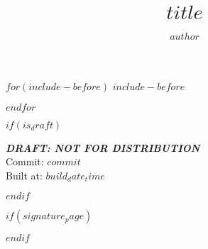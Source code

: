 \documentclass[11 pt]{report}
\begin{document}
$for(include-before)$
$include-before$

$endfor$

%

$if(is_draft)$
\thispagestyle{empty}%
    \null
    \vfill
    \begin{center}
        \rm\expandafter{\LARGE{\textbf{\emph{DRAFT: NOT FOR DISTRIBUTION}}}}\\
        [16 pt] 
        Commit: $commit$ \\
        \vspace{1em}
        Built at: $build_date_time$
    \end{center}
    \vfill
\newpage
$endif$


%


$if(signature_page)$
    
$endif$

\title{$title$}

\author{$author$}


\end{document}
